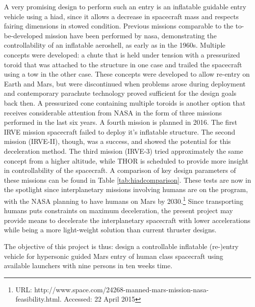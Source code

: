 A very promising design to perform such an entry is an inflatable guidable entry vehicle using a \gls{hiad}, since it allows a decrease in spacecraft mass and respects fairing dimensions in stowed condition. Previous missions comparable to the to-be-developed mission have been performed by \gls{nasa}, demonstrating the controllability of an inflatable aeroshell, as early as in the 1960s. Multiple concepts were developed: a chute that is held under tension with a pressurized toroid that was attached to the structure in one case and trailed the spacecraft using a tow in the other case. These concepts were developed to allow re-entry on Earth and Mars, but were discontinued when problems arose during deployment and contemporary parachute technology proved sufficient for the design goals back then. \citep{hiadhistory}
A pressurized cone containing multiple toroids is another option that receives considerable attention from NASA in the form of three missions performed in the last six years. A fourth mission is planned in 2016. The first IRVE mission spacecraft failed to deploy it's inflatable structure. The second mission (IRVE-II), though, was a success, and showed the potential for this deceleration method. The third mission (IRVE-3) tried approximately the same concept from a higher altitude, while THOR is scheduled to provide more insight in controllability of the spacecraft. \cite{irve2,irve3,thor} A comparison of key design parameters of these missions can be found in Table \ref{tab:hiadcomparison}.
These tests are now in the spotlight since interplanetary missions involving humans are on the program, with the NASA planning to have humans on Mars by 2030.\footnote{URL: http://www.space.com/24268-manned-mars-mission-nasa-feasibility.html. Accessed: 22 April 2015} Since transporting humans puts constraints on maximum deceleration, the present project may provide means to decelerate the interplanetary spacecraft with lower accelerations while being a more light-weight solution than current thruster designs.

The objective of this project is thus: design a controllable inflatable (re-)entry vehicle for hypersonic guided Mars entry of human class spacecraft using available launchers with nine persons in ten weeks time.

